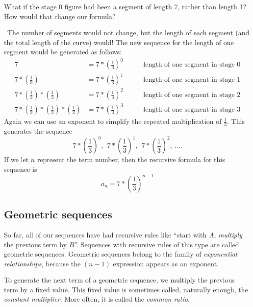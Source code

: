 \begin{boxedex}
What if the stage 0 figure had been a segment of length 7, rather than length 1? How would that change our formula?

\exsoln\ The number of segments would not change, but the length of each segment (and the total length of the curve) would! The new sequence for the length of one segment would be generated as follows:
\[\begin{aligned}
7 &=7\ast\left(\frac{1}{3}\right)^{0}
&& \quad\text{ length of one segment in stage 0}
\\
7 \ast\left(\frac{1}{3}\right) &= 7\ast\left(\frac{1}{3}\right)^{1}
&& \quad\text{ length of one segment in stage 1}
\\
7 \ast\left(\frac{1}{3}\right) \ast\left(\frac{1}{3}\right) &= 7\ast\left(\frac{1}{3}\right)^{2}
&& \quad\text{ length of one segment in stage 2}
\\
7 \ast\left(\frac{1}{3}\right) \ast\left(\frac{1}{3}\right) \ast\left(\frac{1}{3}\right) &= 7\ast\left(\frac{1}{3}\right)^{3}
&& \quad\text{ length of one segment in stage 3}
\end{aligned}\]Again we can use an exponent to simplify the repeated multiplication of $\frac{1}{3}$.
This generates the sequence
\[7\ast\left(\frac{1}{3}\right)^0,
~~ 7\ast\left(\frac{1}{3}\right)^1,
~~ 7\ast\left(\frac{1}{3}\right)^2,
~ \dotsc.\]
If we let $n$ represent the term number, then the recursive formula for this sequence is \[a_n = 7 \ast \left(\frac{1}{3}\right)^{n-1}\]
\end{boxedex}

\subsection{Geometric sequences}

So far, all of our sequences have had recursive rules like ``start with $A$, \textit{multiply} the previous term by $B$''. Sequences with recursive rules of this type are called \glspl{geometric sequence}. Geometric sequences belong to the family of \textit{exponential relationships}, because the $(n-1)$ expression appears as an exponent.

To generate the next term of a geometric sequence, we multiply the previous term by a fixed value. This fixed value is sometimes called, naturally enough, the \textit{constant multiplier}. More often, it is called the \textit{common ratio}.

